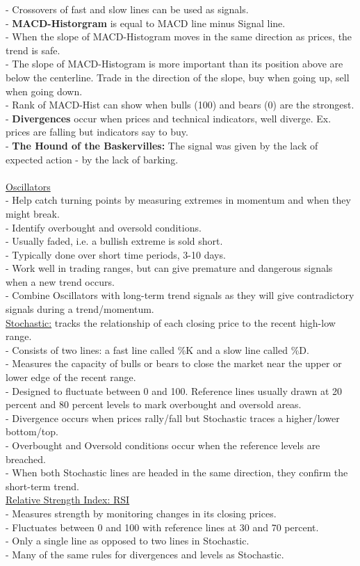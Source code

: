 \documentclass[12pt,fullpage]{article}
\begin{document}
- Crossovers of fast and slow lines can be used as signals.\\
- \textbf{MACD-Historgram} is equal to MACD line minus Signal line.\\
- When the slope of MACD-Histogram moves in the same direction as prices, the trend is safe.\\
- The slope of MACD-Histogram is more important than its position above are below the centerline. Trade in the direction of the slope, buy when going up, sell when going down.\\
- Rank of MACD-Hist can show when bulls (100) and bears (0) are the strongest.\\
- \textbf{Divergences} occur when prices and technical indicators, well diverge. Ex. prices are falling but indicators say to buy.\\
- \textbf{The Hound of the Baskervilles:} The signal was given by the lack of expected action - by the lack of barking.\\
\\
\underline{Oscillators}\\
- Help catch turning points by measuring extremes in momentum and when they might break.\\
- Identify overbought and oversold conditions.\\
- Usually faded, i.e. a bullish extreme is sold short.\\
- Typically done over short time periods, 3-10 days.\\
- Work well in trading ranges, but can give premature and dangerous signals when a new trend occurs.\\
- Combine Oscillators with long-term trend signals as they will give contradictory signals during a trend/momentum.\\
\underline{Stochastic:} tracks the relationship of each closing price to the recent high-low range.\\
- Consists of two lines: a fast line called \%K and a slow line called \%D.\\
- Measures the capacity of bulls or bears to close the market near the upper or lower edge of the recent range.\\
- Designed to fluctuate between 0 and 100. Reference lines usually drawn at 20 percent and 80 percent levels to mark overbought and oversold areas.\\
- Divergence occurs when prices rally/fall but Stochastic traces a higher/lower bottom/top.\\
- Overbought and Oversold conditions occur when the reference levels are breached.\\
- When both Stochastic lines are headed in the same direction, they confirm the short-term trend.\\
\underline{Relative Strength Index: RSI}\\
- Measures strength by monitoring changes in its closing prices.\\
- Fluctuates between 0 and 100 with reference lines at 30 and 70 percent.\\
- Only a single line as opposed to two lines in Stochastic.\\
- Many of the same rules for divergences and levels as Stochastic.
\end{document}
